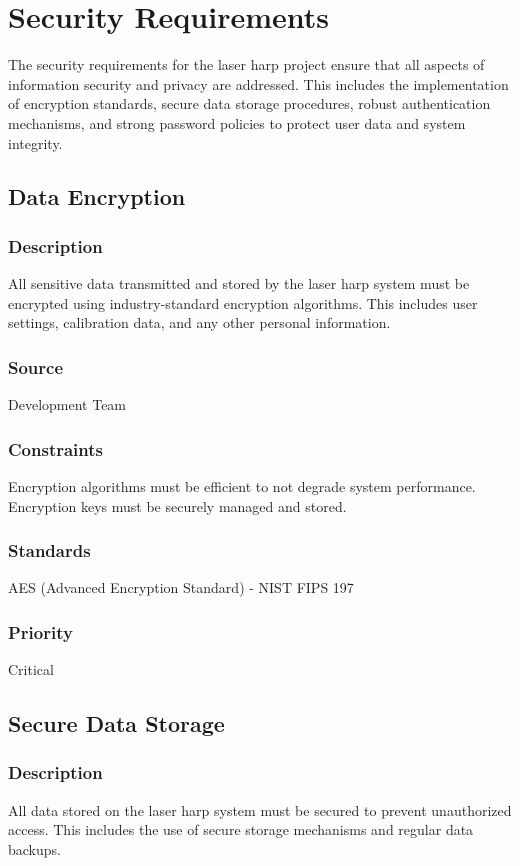 \section{Security Requirements}

The security requirements for the laser harp project ensure that all aspects of information security and privacy are addressed. This includes the implementation of encryption standards, secure data storage procedures, robust authentication mechanisms, and strong password policies to protect user data and system integrity.

\subsection{Data Encryption}
\subsubsection{Description}
All sensitive data transmitted and stored by the laser harp system must be encrypted using industry-standard encryption algorithms. This includes user settings, calibration data, and any other personal information.
\subsubsection{Source}
Development Team
\subsubsection{Constraints}
Encryption algorithms must be efficient to not degrade system performance. Encryption keys must be securely managed and stored.
\subsubsection{Standards}
AES (Advanced Encryption Standard) - NIST FIPS 197
\subsubsection{Priority}
Critical


\subsection{Secure Data Storage}
\subsubsection{Description}
All data stored on the laser harp system must be secured to prevent unauthorized access. This includes the use of secure storage mechanisms and regular data backups.
